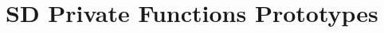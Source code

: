 \hypertarget{group___s_d___private___functions___prototypes}{}\section{SD Private Functions Prototypes}
\label{group___s_d___private___functions___prototypes}
